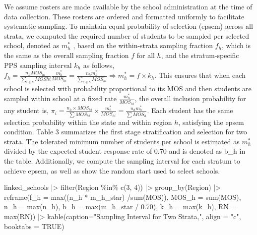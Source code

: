 \documentclass[
  12pt]{article}
\newenvironment{Shaded}{\begin{snugshade}}{\end{snugshade}}
\newcommand{\AttributeTok}[1]{\textcolor[rgb]{0.40,0.45,0.13}{#1}}
\newcommand{\ConstantTok}[1]{\textcolor[rgb]{0.56,0.35,0.01}{#1}}
\newcommand{\DecValTok}[1]{\textcolor[rgb]{0.68,0.00,0.00}{#1}}
\newcommand{\FloatTok}[1]{\textcolor[rgb]{0.68,0.00,0.00}{#1}}
\newcommand{\FunctionTok}[1]{\textcolor[rgb]{0.28,0.35,0.67}{#1}}
\newcommand{\NormalTok}[1]{\textcolor[rgb]{0.00,0.23,0.31}{#1}}
\newcommand{\SpecialCharTok}[1]{\textcolor[rgb]{0.37,0.37,0.37}{#1}}
\newcommand{\StringTok}[1]{\textcolor[rgb]{0.13,0.47,0.30}{#1}}
\begin{document}
We assume rosters are made available by the school administration at the
time of data collection. These rosters are ordered and formatted
uniformly to facilitate systematic sampling. To maintain equal
probability of selection (epsem) across all strata, we computed the
required number of students to be sampled per selected school, denoted
as \(m^*_h\) , based on the within-strata sampling fraction \(f_h\),
which is the same as the overall sampling fraction \(f\) for all \(h\),
and the stratum-specific PPS sampling interval \(k_h\) as follows,
\(f_h = \frac{n_h MOS_{hi} }{\sum_{i \in h} MOS{hi} } \frac{m^*_h}{MOS_{hi}} = \frac{n_h m^*_h}{\sum_{e \in h}MOS_{hi}} \Rightarrow m^*_h = f \times k_h\).
This ensures that when each school is selected with probability
proportional to its MOS and then students are sampled within school at a
fixed rate \(\frac{m^*_h}{MOS_{hi}}\), the overall inclusion probability
for any student is,
\(\pi_{i} = \frac{n_h \times MOS_{hi}}{\sum MOS_{hi}} \times \frac{m^*_h}{MOS_{hi}} = \frac{n_h m^*_h}{\sum MOS_h}\).
Each student has the same selection probability within the state and
within region \(h\), satisfying the epsem condition. Table 3 summarizes
the first stage stratification and selection for two strata. The
tolerated minimum number of students per school is estimated as
\(m^*_h\) divided by the expected student response rate of 0.70 and is
denoted as b\_h in the table. Additionally, we compute the sampling
interval for each stratum to achieve epsem, as well as show the random
start used to select schools.

\begin{Shaded}
\begin{Highlighting}[]
\NormalTok{linked\_schools }\SpecialCharTok{|\textgreater{}} 
  \FunctionTok{filter}\NormalTok{(Region }\SpecialCharTok{\%in\%} \FunctionTok{c}\NormalTok{(}\DecValTok{3}\NormalTok{, }\DecValTok{4}\NormalTok{)) }\SpecialCharTok{|\textgreater{}} 
  \FunctionTok{group\_by}\NormalTok{(Region) }\SpecialCharTok{|\textgreater{}} 
  \FunctionTok{reframe}\NormalTok{(}\AttributeTok{f\_h =}  \FunctionTok{max}\NormalTok{((n\_h }\SpecialCharTok{*}\NormalTok{ m\_h\_star) }\SpecialCharTok{/}\FunctionTok{sum}\NormalTok{(MOS)),}
         \AttributeTok{MOS\_h =} \FunctionTok{sum}\NormalTok{(MOS), }
         \AttributeTok{n\_h =} \FunctionTok{max}\NormalTok{(n\_h),}
         \AttributeTok{b\_h =} \FunctionTok{max}\NormalTok{(m\_h\_star }\SpecialCharTok{/} \FloatTok{0.70}\NormalTok{),}
         \AttributeTok{k\_h =} \FunctionTok{max}\NormalTok{(k\_h), }
         \AttributeTok{RN =} \FunctionTok{max}\NormalTok{(RN)) }\SpecialCharTok{|\textgreater{}} 
  \FunctionTok{kable}\NormalTok{(}\AttributeTok{caption=}\StringTok{"Sampling Interval for Two Strata,"}\NormalTok{,}
        \AttributeTok{align =} \StringTok{"c"}\NormalTok{, }\AttributeTok{booktabs =} \ConstantTok{TRUE}\NormalTok{) }
\end{Highlighting}
\end{Shaded}
\end{document}
